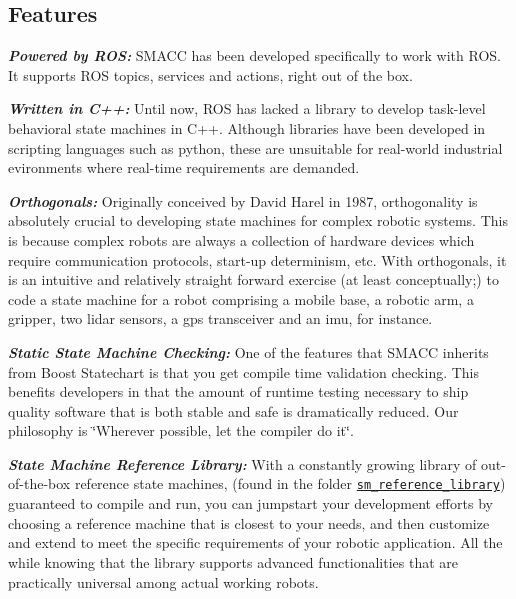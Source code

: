 \subsection*{Features}


\begin{DoxyItemize}
\item {\itshape {\bfseries Powered by R\+OS\+:}} S\+M\+A\+CC has been developed specifically to work with R\+OS. It supports R\+OS topics, services and actions, right out of the box.
\item {\itshape {\bfseries Written in C++\+:}} Until now, R\+OS has lacked a library to develop task-\/level behavioral state machines in C++. Although libraries have been developed in scripting languages such as python, these are unsuitable for real-\/world industrial evironments where real-\/time requirements are demanded.
\item {\itshape {\bfseries Orthogonals\+:}} Originally conceived by David Harel in 1987, orthogonality is absolutely crucial to developing state machines for complex robotic systems. This is because complex robots are always a collection of hardware devices which require communication protocols, start-\/up determinism, etc. With orthogonals, it is an intuitive and relatively straight forward exercise (at least conceptually;) to code a state machine for a robot comprising a mobile base, a robotic arm, a gripper, two lidar sensors, a gps transceiver and an imu, for instance.
\item {\itshape {\bfseries Static State Machine Checking\+:}} One of the features that S\+M\+A\+CC inherits from Boost Statechart is that you get compile time validation checking. This benefits developers in that the amount of runtime testing necessary to ship quality software that is both stable and safe is dramatically reduced. Our philosophy is \char`\"{}\+Wherever possible, let the compiler do it\char`\"{}.
\item {\itshape {\bfseries State Machine Reference Library\+:}} With a constantly growing library of out-\/of-\/the-\/box reference state machines, (found in the folder \href{https://github.com/reelrbtx/SMACC/tree/master/smacc_sm_reference_library}{\tt sm\+\_\+reference\+\_\+library}) guaranteed to compile and run, you can jumpstart your development efforts by choosing a reference machine that is closest to your needs, and then customize and extend to meet the specific requirements of your robotic application. All the while knowing that the library supports advanced functionalities that are practically universal among actual working robots.

\end{DoxyItemize}
